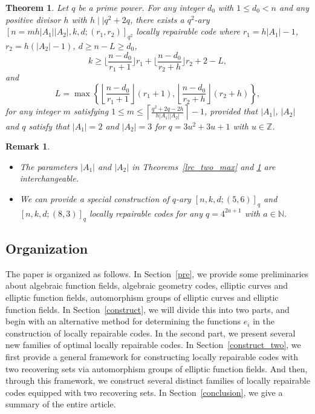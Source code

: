 \documentclass[journal,12pt,onecolumn]{IEEEtran}
\newtheorem{theorem}{Theorem}
\newtheorem{remark}{Remark}
\begin{document}
\begin{theorem}\label{lrc_two_nonmax}
    Let \( q \) be a prime power. For any integer \( d_0 \) with \( 1 \leq d_0 < n \) and any positive divisor \( h \) with \(h\mid\mid q^2+2q\), there exists a \( q^2 \)-ary \([n = mh|A_1||A_2|, k, d;(r_1,r_2)]_{q^2}\) locally repairable code where \( r_1 = h|A_1| - 1 \), \(r_2 = h(|A_2|-1)\), \(d \ge n - L \ge d_0\), 
    \[
        k \geq \bigg\lfloor\frac{n-d_0}{r_1 + 1}\bigg\rfloor r_1 + \bigg\lfloor\frac{n-d_0}{r_2 + h}\bigg\rfloor r_2  + 2 - L,
    \]
    and
    \[
        L = \max\left\{\left\lfloor\frac{n-d_0}{r_1 + 1}\right\rfloor (r_1+1),\left\lfloor\frac{n-d_0}{r_2 + h}\right\rfloor (r_2 + h)\right\}, 
    \]
    for any integer \( m \) satisfying \(1 \leq m \leq \left\lceil \frac{q^2+2q-2h}{h|A_1||A_2|} \right\rceil - 1 \), provided that \(|A_1|\), \(|A_2|\) and \( q \) satisfy that \(|A_1| = 2\) and \(|A_2| = 3\) for \(q = 3u^2 + 3u + 1\) with \(u\in\mathbb{Z}\). 
\end{theorem}

\begin{remark}
    \begin{itemize}
        \item[(i)] The parameters \(|A_1|\) and \(|A_2|\) in Theorems~\ref{lrc_two_max} and \ref{lrc_two_nonmax} are interchangeable. 
        \item[(ii)] We can provide a special construction of \(q\)-ary \([n, k, d;(5,6)]_q\) and \([n, k, d;(8,3)]_q\) locally repairable codes for any \( q = 4^{2a+1} \) with \( a \in \mathbb{N} \).
    \end{itemize}
\end{remark}






\subsection{Organization}

The paper is organized as follows. In Section~\ref{pre}, we provide some preliminaries about algebraic function fields, algebraic geometry codes, elliptic curves and elliptic function fields, automorphism groups of elliptic curves and elliptic function fields. In Section~\ref{construct}, we will divide this into two parts, and begin with an alternative method for determining the functions \(e_i\) in the construction of locally repairable codes. In the second part, we present several new families of optimal locally repairable codes. In Section~\ref{construct_two}, we first provide a general framework for constructing locally repairable codes with two recovering sets via automorphism groups of elliptic function fields. And then, through this framework, we construct several distinct families of locally repairable codes equipped with two recovering sets. In Section~\ref{conclusion}, we give a summary of the entire article.
\end{document}
